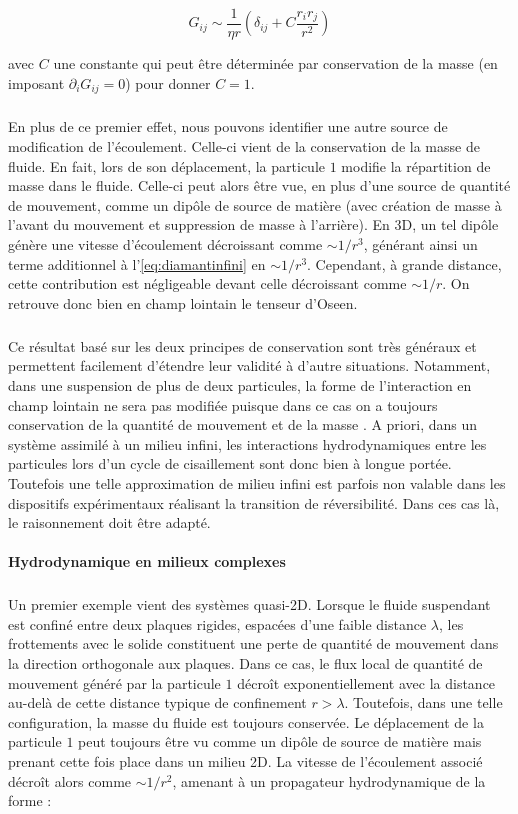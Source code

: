 \begin{equation}
	G_{ij} \sim \frac{1}{\eta r}\left( \delta_{ij}+C\frac{r_ir_j}{r^2} \right)
	\label{eq:diamantinfini}
\end{equation}

\noindent avec $C$ une constante qui peut être déterminée par conservation de la masse (en imposant $\partial_i G_{ij}=0$) pour donner $C=1$.

\subparagraph{}En plus de ce premier effet, nous pouvons identifier une autre source de modification de l'écoulement. Celle-ci vient de la conservation de la masse de fluide. En fait, lors de son déplacement, la particule $1$ modifie la répartition de masse dans le fluide. Celle-ci peut alors être vue, en plus d'une source de quantité de mouvement, comme un dipôle de source de matière (avec création de masse à l'avant du mouvement et suppression de masse à l'arrière). En 3D, un tel dipôle génère une vitesse d'écoulement décroissant comme $\sim 1/r^3$, générant ainsi un terme additionnel à l'\autoref{eq:diamantinfini} en $\sim 1/r^3$. Cependant, à grande distance, cette contribution est négligeable devant celle décroissant comme $\sim 1/r$. On retrouve donc bien en champ lointain le tenseur d'Oseen.

\subparagraph{}Ce résultat basé sur les deux principes de conservation sont très généraux et permettent facilement d'étendre leur validité à d'autre situations. Notamment, dans une suspension de plus de deux particules, la forme de l'interaction en champ lointain ne sera pas modifiée puisque dans ce cas on a toujours conservation de la quantité de mouvement et de la masse \cite{diamant_hydrodynamic_2009}. A priori, dans un système assimilé à un milieu infini, les interactions hydrodynamiques entre les particules lors d'un cycle de cisaillement sont donc bien à longue portée. Toutefois une telle approximation de milieu infini est parfois non valable dans les dispositifs expérimentaux réalisant la transition de réversibilité. Dans ces cas là, le raisonnement doit être adapté.

\paragraph{Hydrodynamique en milieux complexes}

\subparagraph{}Un premier exemple vient des systèmes quasi-2D. Lorsque le fluide suspendant est confiné entre deux plaques rigides, espacées d'une faible distance $\lambda$, les frottements avec le solide constituent une perte de quantité de mouvement dans la direction orthogonale aux plaques. Dans ce cas, le flux local de quantité de mouvement généré par la particule $1$ décroît exponentiellement avec la distance au-delà de cette distance typique de confinement $r>\lambda$. Toutefois, dans une telle configuration, la masse du fluide est toujours conservée. Le déplacement de la particule $1$ peut toujours être vu comme un dipôle de source de matière mais prenant cette fois place dans un milieu 2D. La vitesse de l'écoulement associé décroît alors comme $\sim 1/r^2$, amenant à un propagateur hydrodynamique de la forme :

